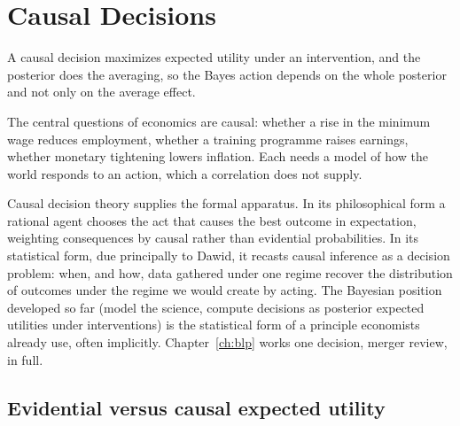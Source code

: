 \chapter{Causal Decisions}\label{ch:cdt}

\begin{tcolorbox}[colback=gray!6,colframe=gray!50,title=In brief,fonttitle=\normalfont\itshape,coltitle=black,colbacktitle=gray!15,boxrule=0.4pt,arc=1pt]
A causal decision maximizes expected utility under an intervention, and the posterior does the averaging, so the Bayes action depends on the whole posterior and not only on the average effect.
\end{tcolorbox}

The central questions of economics are causal: whether a rise in the minimum wage reduces employment, whether a training programme raises earnings, whether monetary tightening lowers inflation. Each needs a model of how the world responds to an action, which a correlation does not supply.

Causal decision theory supplies the formal apparatus. In its philosophical form a rational agent chooses the act that causes the best outcome in expectation, weighting consequences by causal rather than evidential probabilities. In its statistical form, due principally to Dawid, it recasts causal inference as a decision problem: when, and how, data gathered under one regime recover the distribution of outcomes under the regime we would create by acting. The Bayesian position developed so far (model the science, compute decisions as posterior expected utilities under interventions) is the statistical form of a principle economists already use, often implicitly. Chapter~\ref{ch:blp} works one decision, merger review, in full.

\section{Evidential versus causal expected utility}\label{cdt:sec:core}


